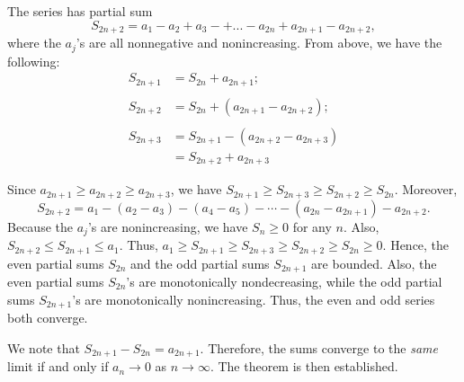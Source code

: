 \documentclass[12pt]{article}
\begin{document}
The series has partial sum
\[
S_{2n+2}=a_1-a_2+a_3-+...-a_{2n}+a_{2n+1}-a_{2n+2},
\] 
where the $a_j$'s are all nonnegative and nonincreasing.  
From above, we have the following:
\begin{align*}
S_{2n+1} & =S_{2n}+a_{2n+1}; \\
\\
S_{2n+2} & =S_{2n}+(a_{2n+1}-a_{2n+2}); \\
\\
S_{2n+3} & =S_{2n+1}-(a_{2n+2}-a_{2n+3}) \\
         & =S_{2n+2}+a_{2n+3}
\end{align*}

Since $a_{2n+1} \geq a_{2n+2}\geq a_{2n+3}$, we have $S_{2n+1}\geq S_{2n+3} \geq S_{2n+2} \geq S_{2n}$.  Moreover,
\[
S_{2n+2}=a_1-(a_2-a_3)-(a_4-a_5)-\cdots-(a_{2n}-a_{2n+1})-a_{2n+2}.
\]
Because the $a_j$'s are nonincreasing, we have $S_n \geq 0$ for any $n$.  Also, $S_{2n+2} \leq S_{2n+1} \leq a_1$.  Thus, $a_1 \geq S_{2n+1} \geq S_{2n+3} \geq S_{2n+2} \geq S_{2n} \geq 0$.  Hence, the even partial sums $S_{2n}$ and the odd partial sums $S_{2n+1}$ are bounded.  Also, the even partial sums $S_{2n}$'s are monotonically nondecreasing, while the odd partial sums $S_{2n+1}$'s are monotonically nonincreasing.  Thus, the even and odd series both converge.

We note that $S_{2n+1}-S_{2n}=a_{2n+1}$.  Therefore, the sums converge to the \emph{same} limit if and only if $a_n\to 0$ as $n\to\infty$. The theorem is then established.
\end{document}
